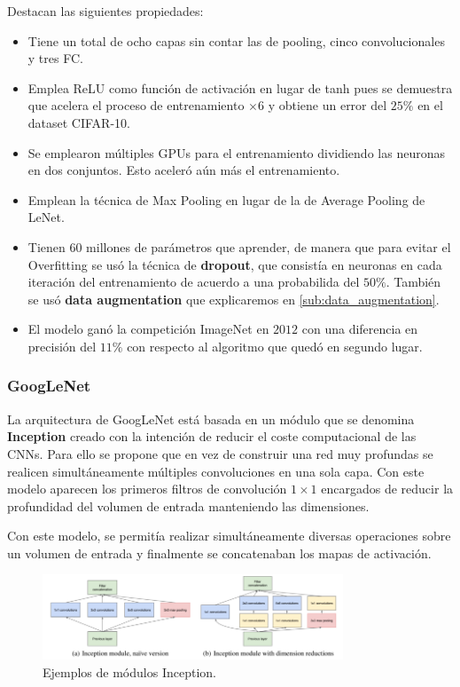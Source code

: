         \noindent Destacan las siguientes propiedades:

        \begin{itemize}
            \item Tiene un total de ocho capas sin contar las de pooling, cinco convolucionales y tres FC.
            \item Emplea ReLU como función de activación en lugar de tanh pues se demuestra que acelera el proceso de entrenamiento $\times 6$ y obtiene un error del $25\%$ en el dataset CIFAR-10.
            \item Se emplearon múltiples GPUs para el entrenamiento dividiendo las neuronas en dos conjuntos. Esto aceleró aún más el entrenamiento.
            \item Emplean la técnica de Max Pooling en lugar de la de Average Pooling de LeNet. 
            \item Tienen 60 millones de parámetros que aprender, de manera que para evitar el Overfitting se usó la técnica de \textbf{dropout}, que consistía en  neuronas en cada iteración del entrenamiento de acuerdo a una probabilida del $50\%$. También se usó \textbf{data augmentation} que explicaremos en \autoref{sub:data_augmentation}.
            \item El modelo ganó la competición ImageNet en $2012$ con una diferencia en precisión del $11\%$ con respecto al algoritmo que quedó en segundo lugar.
        \end{itemize}
    
    \subsubsection{GoogLeNet}
        \noindent La arquitectura de GoogLeNet está basada en un módulo que se denomina \textbf{Inception} creado con la intención de reducir el coste computacional de las CNNs. Para ello se propone que en vez de construir una red muy profundas se realicen simultáneamente múltiples convoluciones en una sola capa. Con este modelo aparecen los primeros filtros de convolución $1\times 1$ encargados de reducir la profundidad del volumen de entrada manteniendo las dimensiones.

        \medskip

        \noindent Con este modelo, se permitía realizar simultáneamente diversas operaciones sobre un volumen de entrada y finalmente se concatenaban los mapas de activación.

        \begin{figure}[!h]
            \centering
            \includegraphics[width=0.8\textwidth]{img/inception_module.png}
            \caption{Ejemplos de módulos Inception.}
            \label{fig:inception}
        \end{figure}

